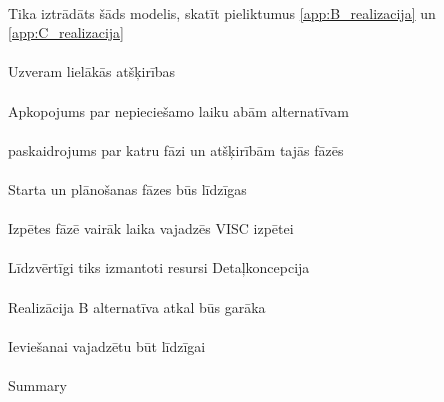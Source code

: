 \paragraph{}
Tika iztrādāts šāds modelis, skatīt pieliktumus \ref{app:B_realizacija} un \ref{app:C_realizacija}
\paragraph{}
Uzveram lielākās atšķirības
\paragraph{}
Apkopojums par nepieciešamo laiku abām alternatīvam
\paragraph{}
paskaidrojums par katru fāzi un atšķirībām tajās fāzēs
\paragraph{}
Starta un plānošanas fāzes būs līdzīgas
\paragraph{}
Izpētes fāzē vairāk laika vajadzēs VISC izpētei
\paragraph{}
Līdzvērtīgi tiks izmantoti resursi Detaļkoncepcija
\paragraph{}
Realizācija B alternatīva atkal būs garāka
\paragraph{}
Ieviešanai vajadzētu būt līdzīgai
\paragraph{}
Summary
